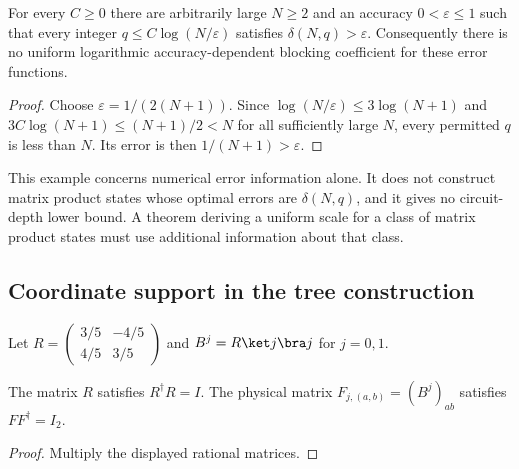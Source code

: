 \begin{lemma}
    \label{lem:ldp_delayed_blocking_no_uniform_scale}
    \leanok
    For every $C\ge0$ there are arbitrarily large $N\ge2$ and an accuracy
    $0<\varepsilon\le1$ such that every integer
    $q\le C\log(N/\varepsilon)$ satisfies $\delta(N,q)>\varepsilon$.
    Consequently there is no uniform logarithmic accuracy-dependent blocking
    coefficient for these error functions.
\end{lemma}
\begin{proof}\leanok
    Choose $\varepsilon=1/(2(N+1))$. Since
    $\log(N/\varepsilon)\le3\log(N+1)$ and
    $3C\log(N+1)\le(N+1)/2<N$ for all sufficiently large $N$,
    every permitted $q$ is less than $N$. Its error is then
    $1/(N+1)>\varepsilon$.
\end{proof}

This example concerns numerical error information alone. It does not
construct matrix product states whose optimal errors are $\delta(N,q)$,
and it gives no circuit-depth lower bound. A theorem deriving a uniform
scale for a class of matrix product states must use additional information
about that class.

\subsection{Coordinate support in the tree construction}

\begin{definition}
    \label{def:ldp_rotated_ghz_flags}
    \leanok
    Let $R=\left(\begin{smallmatrix}3/5&-4/5\\4/5&3/5\end{smallmatrix}\right)$
    and $B^j=R\ket j\bra j$ for $j=0,1$.
\end{definition}

\begin{lemma}
    \label{lem:ldp_rotated_ghz_coisometry}
    \leanok
    The matrix $R$ satisfies $R^\dagger R=I$. The physical matrix
    $F_{j,(a,b)}=(B^j)_{ab}$ satisfies $FF^\dagger=I_2$.
\end{lemma}
\begin{proof}\leanok
    Multiply the displayed rational matrices.
\end{proof}

